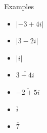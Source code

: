\documentclass{beamer}
\begin{document}
\begin{frame}{Examples}
\begin{example}
	\begin{itemize}
		\item $|-3+4i|$
		\item $|3-2i|$
		\item $|i|$
	\end{itemize}
\end{example}
\begin{example}
\begin{itemize}
\item $\overline{3+4i}$
\item $\overline{-2+5i}$
\item $\overline{i}$
\item $\overline{7}$
\end{itemize}
\end{example}
\end{frame}
\end{document}
